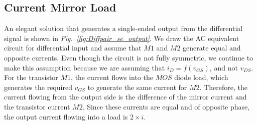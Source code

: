 \subsection{Current Mirror Load} \label{sec:cur_mir_load}
An elegant solution that generates a single-ended output from the differential signal is shown in \emph{Fig.~\ref{fig:Diffpair_se_output}}.  We draw the AC equivalent circuit for differential input and assume that $M1$ and $M2$ generate equal and opposite currents.  Even though the circuit is not fully symmetric, we continue to make this assumption because we are assuming that $i_D = f(v_{GS})$, and not $v_{DS}$.  For the transistor $M1$, the current flows into the $MOS$ diode load, which generates the required $v_{GS}$ to generate the same current for $M2$.  Therefore, the current flowing from the output side is the difference of the mirror current and the transistor current $M2$.  Since these currents are equal and of opposite phase, the output current flowing into a load is $2 \times i$.
\newpage
